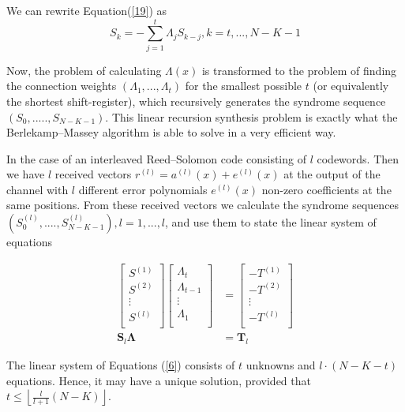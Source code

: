\documentclass[fontsize=12pt]{article}
\begin{document}
We can rewrite Equation(\ref{19}) as 
\begin{equation}
S_k = -\sum_{j=1}^{t} \Lambda_jS_{k-j}, k=t,...,N-K-1
\end{equation}

Now, the problem of calculating $\Lambda(x)$ is transformed to the
problem of finding the connection weights $(\Lambda_1,...,\Lambda_t)$ for
the smallest possible $t$ (or equivalently the shortest shift-register),
which recursively generates the syndrome sequence $(S_0,.....,S_{N-K-1})$. This linear recursion synthesis problem is exactly what the Berlekamp–Massey algorithm is able to solve in a very efficient way.

In the case of an interleaved Reed–Solomon
code consisting of $l$ codewords. Then we have $l$ received
vectors $r^(l)=a^(l)(x)+e^(l)(x)$ at the output of the channel
with $l$ different error polynomials $e^(l)(x)$ non-zero
coefficients at the same positions. From these received vectors
we calculate the syndrome sequences $(S^{(\mathit{l})}_0,....,S^{(\mathit{l})}_{N-K-1}), \mathit{l}=1,...,l$,  and use them to state the linear system of equations

\begin{equation}
\begin{split}
\begin{bmatrix}
    S^{(1)}  \\
    S^{(2)} \\
    \vdots{} \\
    S^{(l)}  \\
\end{bmatrix}
\begin{bmatrix}
    \Lambda_{t}\\
    \Lambda_{t-1}\\
    \vdots{}\\
    \Lambda_{1}\\
\end{bmatrix}
&=
\begin{bmatrix}
     -T^{(1)}\\
    -T^{(2)}\\
    \vdots{}\\
    -T^{(l)}\\
\end{bmatrix}\\
\mathbf{S}_l\mathbf{\Lambda}&=\mathbf{T}_l
\end{split}
\label{6}
\end{equation}

The linear system of Equations (\ref{6}) consists of $t$ unknowns and
$l\cdot (N-K-t)$ equations. Hence, it may have a unique solution,
provided that $t \leq \left \lfloor \frac{l}{l+1} ({N - K}) \right \rfloor$.
\end{document}
